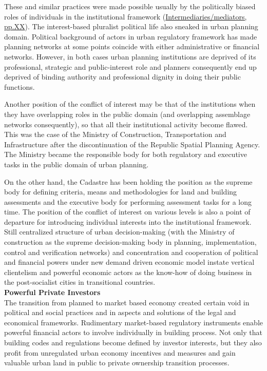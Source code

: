 \documentclass[11pt]{report}
\begin{document}
These and similar practices were made possible usually by the politically biased roles of individuals in the institutional framework (\href{}{Intermediaries/mediators, pp.XX}).
The interest-based pluralist political life also sneaked in urban planning domain.
Political background of actors in urban regulatory framework has made planning networks at some points coincide with either administrative or financial networks.
However, in both cases urban planning institutions are deprived of its professional, strategic and public-interest role and planners consequently end up deprived of binding authority and professional dignity in doing their public functions.

Another position of the conflict of interest may be that of the institutions when they have overlapping roles in the public domain (and overlapping assemblage networks consequently), so that all their institutional activity become flawed.
This was the case of the Ministry of Construction, Transportation and Infrastructure after the discontinuation of the Republic Spatial Planning Agency. The Ministry became the responsible body for both regulatory and executive tasks in the public domain of urban planning.

On the other hand, the Cadastre has been holding the position  as the supreme body for defining criteria, means and methodologies for land and building assessments and the executive body for performing assessment tasks for a long time.
The position of the conflict of interest on various levels is also a point of departure for introducing individual interests into the institutional framework. Still centralized structure of urban decision-making (with the Ministry of construction as the supreme decision-making body in planning, implementation, control and verification networks) and concentration and cooperation of political and financial powers under new demand driven economic model instate vertical clientelism and powerful economic actors as the know-how of doing business in the post-socialist cities in transitional countries.
\\

\textbf{Powerful Private Investors}
\\
The transition from planned to market based economy created certain void in political and social practices and in aspects and solutions of the legal and economical frameworks.
Rudimentary market-based regulatory instruments enable powerful financial actors to involve individually in building process.
Not only that building codes and regulations become defined by investor interests, but they also profit from unregulated urban economy incentives and measures and gain valuable urban land in public to private ownership transition processes.
\end{document}
